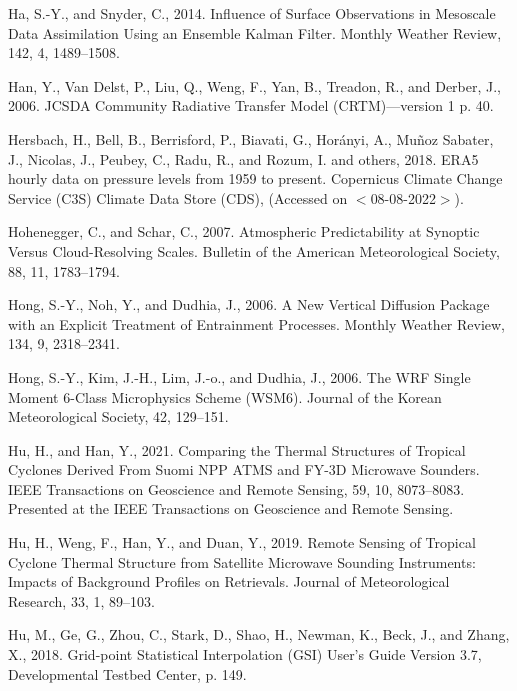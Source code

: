 \documentclass[12pt,oneside]{reedthesis}
\begin{document}
\leavevmode\hypertarget{ref-ha2014}{}%
Ha, S.-Y., and Snyder, C., 2014. Influence of Surface Observations in Mesoscale Data Assimilation Using an Ensemble Kalman Filter. Monthly Weather Review, 142, 4, 1489--1508.

\leavevmode\hypertarget{ref-han2006}{}%
Han, Y., Van Delst, P., Liu, Q., Weng, F., Yan, B., Treadon, R., and Derber, J., 2006. JCSDA Community Radiative Transfer Model (CRTM)---version 1 p. 40.

\leavevmode\hypertarget{ref-era5pressure}{}%
Hersbach, H., Bell, B., Berrisford, P., Biavati, G., Horányi, A., Muñoz Sabater, J., Nicolas, J., Peubey, C., Radu, R., and Rozum, I. and others, 2018. ERA5 hourly data on pressure levels from 1959 to present. Copernicus Climate Change Service (C3S) Climate Data Store (CDS), (Accessed on \(<\)08-08-2022\(>\)).

\leavevmode\hypertarget{ref-hohenegger2007}{}%
Hohenegger, C., and Schar, C., 2007. Atmospheric Predictability at Synoptic Versus Cloud-Resolving Scales. Bulletin of the American Meteorological Society, 88, 11, 1783--1794.

\leavevmode\hypertarget{ref-hong2006a}{}%
Hong, S.-Y., Noh, Y., and Dudhia, J., 2006. A New Vertical Diffusion Package with an Explicit Treatment of Entrainment Processes. Monthly Weather Review, 134, 9, 2318--2341.

\leavevmode\hypertarget{ref-hong2006}{}%
Hong, S.-Y., Kim, J.-H., Lim, J.-o., and Dudhia, J., 2006. The WRF Single Moment 6-Class Microphysics Scheme (WSM6). Journal of the Korean Meteorological Society, 42, 129--151.

\leavevmode\hypertarget{ref-hu2021}{}%
Hu, H., and Han, Y., 2021. Comparing the Thermal Structures of Tropical Cyclones Derived From Suomi NPP ATMS and FY-3D Microwave Sounders. IEEE Transactions on Geoscience and Remote Sensing, 59, 10, 8073--8083. Presented at the IEEE Transactions on Geoscience and Remote Sensing.

\leavevmode\hypertarget{ref-hu2019}{}%
Hu, H., Weng, F., Han, Y., and Duan, Y., 2019. Remote Sensing of Tropical Cyclone Thermal Structure from Satellite Microwave Sounding Instruments: Impacts of Background Profiles on Retrievals. Journal of Meteorological Research, 33, 1, 89--103.

\leavevmode\hypertarget{ref-hu2018}{}%
Hu, M., Ge, G., Zhou, C., Stark, D., Shao, H., Newman, K., Beck, J., and Zhang, X., 2018. Grid-point Statistical Interpolation (GSI) User's Guide Version 3.7, Developmental Testbed Center, p. 149.
\end{document}
